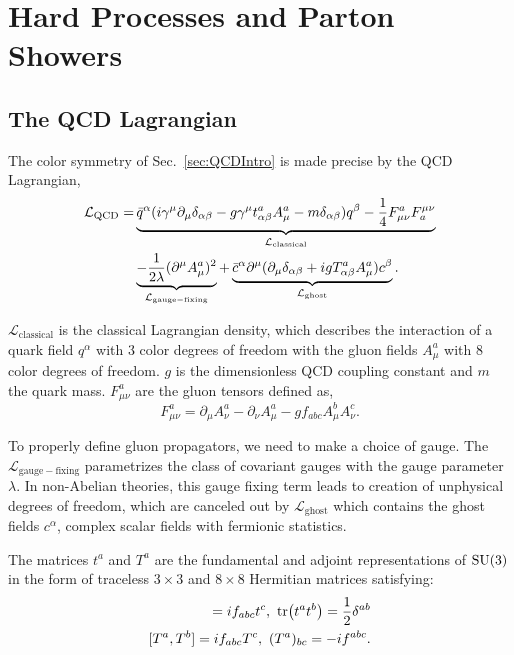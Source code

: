 \chapter{Hard Processes and Parton Showers}
\label{app:theory}
\section{The QCD Lagrangian}
\label{sec:qcdLagrangian}
The color symmetry of Sec.~\ref{sec:QCDIntro} is made precise by the QCD Lagrangian,
\begin{align}
	\mathcal{L}_\mathrm{QCD} = &\underbrace{\bar{q}^\alpha (i \gamma^\mu \partial_\mu\delta_{\alpha\beta} - g\gamma^\mu
		t^a_{\alpha\beta}A^a_\mu - m\delta_{\alpha\beta})q^\beta - \frac{1}{4} F^a_{\mu\nu}F_a^{\mu\nu}}_{\mathcal{L}_\mathrm{classical}}\notag\\ &\underbrace{- \frac{1}{2\lambda}(\partial^\mu A^a_\mu)^2}_{\mathcal{L}_\mathrm{gauge-fixing}}+ \underbrace{\bar{c}^\alpha\partial^\mu(\partial_\mu\delta_{\alpha\beta} + igT^a_{\alpha\beta}A^a_\mu)c^\beta}_{\mathcal{L}_\mathrm{ghost}}.
\end{align}

\(\mathcal{L}_\mathrm{classical}\) is the classical Lagrangian density, which describes the interaction of a quark field \(q^\alpha\) with 3 color degrees of freedom with the gluon fields \(A^a_\mu\) with 8 color degrees of freedom. \(g\) is the dimensionless QCD coupling constant and \(m\) the quark mass. \(F^a_{\mu\nu}\) are the gluon tensors defined as,
\begin{equation}
	F^a_{\mu\nu} = \partial_\mu A_\nu^a - \partial_\nu A_\mu^a - gf_{abc}A^b_\mu A^c_\nu.
	\label{eq:gluonFieldTensor}
\end{equation}

To properly define gluon propagators, we need to make a choice of gauge. The \(\mathcal{L}_\mathrm{gauge-fixing}\) parametrizes the class of covariant gauges with the gauge parameter $\lambda$. In non-Abelian theories, this gauge fixing term leads to creation of unphysical degrees of freedom, which are canceled out by \(\mathcal{L}_\mathrm{ghost}\) which contains the ghost fields \(c^\alpha\), complex scalar fields with fermionic statistics. 

The matrices \(t^a\) and  \(T^a\) are the fundamental and adjoint representations of \(\rm SU(3)\) in the form of traceless \(3\times3\) and \(8\times8\) Hermitian matrices satisfying:
\begin{align}
	[t^a, t^b] = if_{abc}t^c,~\tr(t^at^b) = \frac{1}{2}\delta^{ab} \notag\\
	[T^a, T^b] = if_{abc}T^c,~(T^{a})_{bc} = -if^{abc}.
\end{align}

